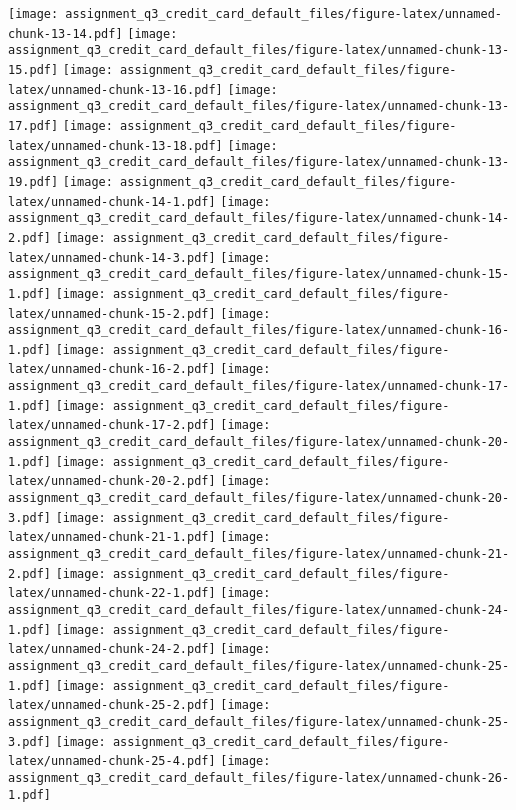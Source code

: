 \texttt{[image: assignment\_q3\_credit\_card\_default\_files/figure-latex/unnamed-chunk-13-14.pdf]}
\texttt{[image: assignment\_q3\_credit\_card\_default\_files/figure-latex/unnamed-chunk-13-15.pdf]}
\texttt{[image: assignment\_q3\_credit\_card\_default\_files/figure-latex/unnamed-chunk-13-16.pdf]}
\texttt{[image: assignment\_q3\_credit\_card\_default\_files/figure-latex/unnamed-chunk-13-17.pdf]}
\texttt{[image: assignment\_q3\_credit\_card\_default\_files/figure-latex/unnamed-chunk-13-18.pdf]}
\texttt{[image: assignment\_q3\_credit\_card\_default\_files/figure-latex/unnamed-chunk-13-19.pdf]}
\texttt{[image: assignment\_q3\_credit\_card\_default\_files/figure-latex/unnamed-chunk-14-1.pdf]}
\texttt{[image: assignment\_q3\_credit\_card\_default\_files/figure-latex/unnamed-chunk-14-2.pdf]}
\texttt{[image: assignment\_q3\_credit\_card\_default\_files/figure-latex/unnamed-chunk-14-3.pdf]}
\texttt{[image: assignment\_q3\_credit\_card\_default\_files/figure-latex/unnamed-chunk-15-1.pdf]}
\texttt{[image: assignment\_q3\_credit\_card\_default\_files/figure-latex/unnamed-chunk-15-2.pdf]}
\texttt{[image: assignment\_q3\_credit\_card\_default\_files/figure-latex/unnamed-chunk-16-1.pdf]}
\texttt{[image: assignment\_q3\_credit\_card\_default\_files/figure-latex/unnamed-chunk-16-2.pdf]}
\texttt{[image: assignment\_q3\_credit\_card\_default\_files/figure-latex/unnamed-chunk-17-1.pdf]}
\texttt{[image: assignment\_q3\_credit\_card\_default\_files/figure-latex/unnamed-chunk-17-2.pdf]}
\texttt{[image: assignment\_q3\_credit\_card\_default\_files/figure-latex/unnamed-chunk-20-1.pdf]}
\texttt{[image: assignment\_q3\_credit\_card\_default\_files/figure-latex/unnamed-chunk-20-2.pdf]}
\texttt{[image: assignment\_q3\_credit\_card\_default\_files/figure-latex/unnamed-chunk-20-3.pdf]}
\texttt{[image: assignment\_q3\_credit\_card\_default\_files/figure-latex/unnamed-chunk-21-1.pdf]}
\texttt{[image: assignment\_q3\_credit\_card\_default\_files/figure-latex/unnamed-chunk-21-2.pdf]}
\texttt{[image: assignment\_q3\_credit\_card\_default\_files/figure-latex/unnamed-chunk-22-1.pdf]}
\texttt{[image: assignment\_q3\_credit\_card\_default\_files/figure-latex/unnamed-chunk-24-1.pdf]}
\texttt{[image: assignment\_q3\_credit\_card\_default\_files/figure-latex/unnamed-chunk-24-2.pdf]}
\texttt{[image: assignment\_q3\_credit\_card\_default\_files/figure-latex/unnamed-chunk-25-1.pdf]}
\texttt{[image: assignment\_q3\_credit\_card\_default\_files/figure-latex/unnamed-chunk-25-2.pdf]}
\texttt{[image: assignment\_q3\_credit\_card\_default\_files/figure-latex/unnamed-chunk-25-3.pdf]}
\texttt{[image: assignment\_q3\_credit\_card\_default\_files/figure-latex/unnamed-chunk-25-4.pdf]}
\texttt{[image: assignment\_q3\_credit\_card\_default\_files/figure-latex/unnamed-chunk-26-1.pdf]}
